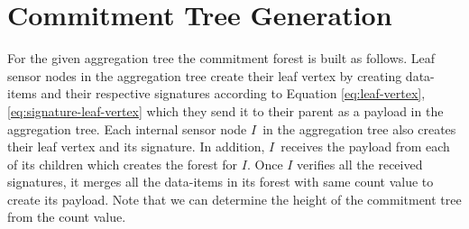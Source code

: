 	\section{Commitment Tree Generation}
	For the given aggregation tree the commitment forest is built as follows.
	Leaf sensor nodes in the aggregation tree create their leaf vertex by creating data-items and their respective signatures according to Equation \ref{eq:leaf-vertex}, \ref{eq:signature-leaf-vertex} which they send it to their parent as a payload in the aggregation tree.
	Each internal sensor node $I$\ in the aggregation tree also creates their leaf vertex and its signature.
	In addition, $I$\ receives the payload from each of its children which creates the forest for $I$.
	Once $I$ verifies all the received signatures, it merges all the data-items in its forest with same count value to create its payload.
	Note that we can determine the height of the commitment tree from the count value.

